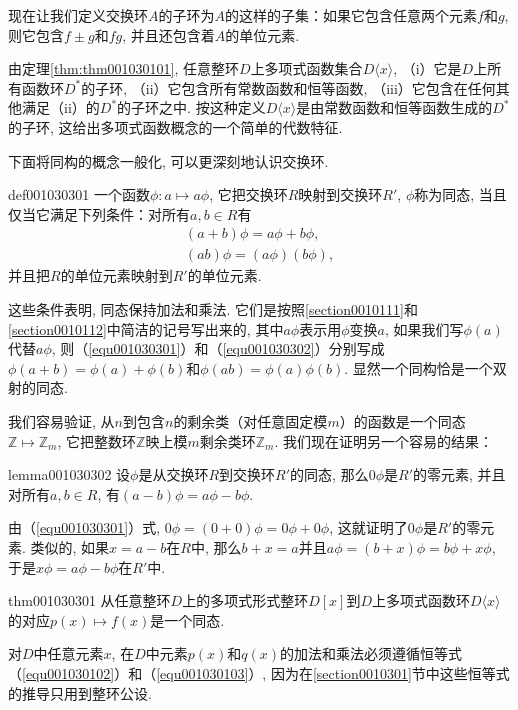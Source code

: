 现在让我们定义交换环$A$的子环为$A$的这样的子集：如果它包含任意两个元素$f$和$g$, 则它包含$f \pm g$和$fg$, 并且还包含着$A$的单位元素. 

由定理\ref{thm:thm001030101}, 任意整环$D$上多项式函数集合$D\langle{}x\rangle$, （i）它是$D$上所有函数环$D^*$的子环, （ii）它包含所有常数函数和恒等函数, （iii）它包含在任何其他满足（ii）的$D^*$的子环之中. 按这种定义$D\langle{}x\rangle$是由常数函数和恒等函数生成的$D^*$的子环, 这给出多项式函数概念的一个简单的代数特征. 

下面将同构的概念一般化, 可以更深刻地认识交换环. 
\begin{definition}{}{def001030301}
一个函数$\phi: a \mapsto a\phi$, 它把交换环$R$映射到交换环$R'$, $\phi$称为同态, 当且仅当它满足下列条件：对所有$a, b \in R$有
\begin{gather}
(a+b)\phi = a\phi + b\phi, \label{equ001030301}\\
(ab)\phi = (a\phi)(b\phi),\label{equ001030302}
\end{gather}
并且把$R$的单位元素映射到$R'$的单位元素. 
\end{definition}

这些条件表明, 同态保持加法和乘法. 它们是按照\ref{section0010111}和\ref{section0010112}中简洁的记号写出来的, 其中$a\phi$表示用$\phi$变换$a$, 如果我们写$\phi(a)$代替$a\phi$, 则（\ref{equ001030301}）和（\ref{equ001030302}）分别写成$\phi(a+b)=\phi(a)+\phi(b)$和$\phi(ab)=\phi(a)\phi(b)$. 显然一个同构恰是一个双射的同态. 

我们容易验证, 从$n$到包含$n$的剩余类（对任意固定模$m$）的函数是一个同态$\mathbb{Z}\mapsto \mathbb{Z}_m$, 它把整数环$\mathbb{Z}$映上模$m$剩余类环$\mathbb{Z}_m$. 我们现在证明另一个容易的结果：
\begin{lemma}{}{lemma001030302}
设$\phi$是从交换环$R$到交换环$R'$的同态, 那么$0\phi$是$R'$的零元素, 并且对所有$a, b \in R$, 有$(a-b)\phi = a\phi - b\phi$. 
\end{lemma}

由（\ref{equ001030301}）式, $0\phi = (0+0)\phi = 0\phi + 0\phi$, 这就证明了$0\phi$是$R'$的零元素. 类似的, 如果$x=a-b$在$R$中, 那么$b+x=a$并且$a\phi = (b+x)\phi = b\phi+x\phi$, 于是$x\phi = a\phi - b\phi$在$R'$中. 

\begin{theorem}{}{thm001030301}
从任意整环$D$上的多项式形式整环$D[x]$到$D$上多项式函数环$D\langle{x}\rangle$的对应$p(x)\mapsto f(x)$是一个同态. 
\end{theorem}

对$D$中任意元素$x$, 在$D$中元素$p(x)$和$q(x)$的加法和乘法必须遵循恒等式（\ref{equ001030102}）和（\ref{equ001030103}）, 因为在\ref{section0010301}节中这些恒等式的推导只用到整环公设. 

